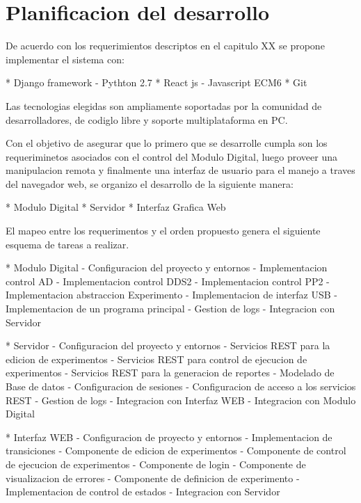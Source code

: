 \section{Planificacion del desarrollo}


De acuerdo con los requerimientos descriptos en el capitulo XX se propone implementar el sistema
con:

    * Django framework - Pythton 2.7
    * React js - Javascript ECM6
    * Git

Las tecnologias elegidas son ampliamente soportadas por la comunidad de desarrolladores, de codiglo libre y soporte multiplataforma en PC.

Con el objetivo de asegurar que lo primero que se desarrolle cumpla son los requeriminetos asociados 
con el control del Modulo Digital, luego proveer una manipulacion remota y finalmente una interfaz de
usuario para el manejo a traves del navegador web, se organizo el desarrollo de la siguiente manera:

    * Modulo Digital
    * Servidor 
    * Interfaz Grafica Web

El mapeo entre los requerimentos y el orden propuesto genera el siguiente esquema de tareas a realizar.

    * Modulo Digital
        - Configuracion del proyecto y entornos
        - Implementacion control AD 
        - Implementacion control DDS2
        - Implementacion control PP2
        - Implementacion abstraccion Experimento
        - Implementacion de interfaz USB
        - Implementacion de un programa principal
        - Gestion de logs
        - Integracion con Servidor

    * Servidor
        - Configuracion del proyecto y entornos
        - Servicios REST para la edicion de experimentos
        - Servicios REST para control de ejecucion de experimentos
        - Servicios REST para la generacion de reportes
        - Modelado de Base de datos 
        - Configuracion de sesiones
        - Configuracion de acceso a los servicios REST
        - Gestion de logs
        - Integracion con Interfaz WEB
        - Integracion con Modulo Digital
    
    * Interfaz WEB
        - Configuracion de proyecto y entornos
        - Implementacion de transiciones
        - Componente de edicion de experimentos
        - Componente de control de ejecucion de experimentos
        - Componente de login
        - Componente de visualizacion de errores
        - Componente de definicion de experimento
        - Implementacion de control de estados
        - Integracion con Servidor

        \newpage